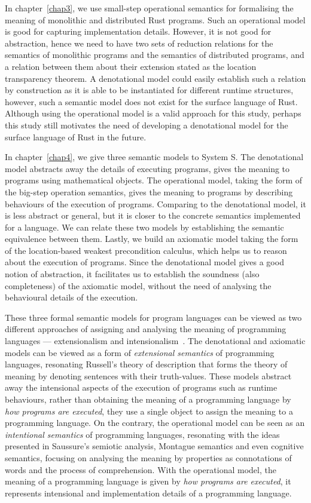 In chapter~\ref{chap3}, we use small-step operational semantics for formalising the meaning of monolithic and distributed Rust programs. Such an operational model is good for capturing implementation details. However, it is not good for abstraction, hence we need to have two sets of reduction relations for the semantics of monolithic programs and the semantics of distributed programs, and a relation between them about their extension stated as the location transparency theorem. A denotational model could easily establish such a relation by construction as it is able to be instantiated for different runtime structures, however, such a semantic model does not exist for the surface language of Rust. Although using the operational model is a valid approach for this study, perhaps this study still motivates the need of developing a denotational model for the surface language of Rust in the future.

In chapter~\ref{chap4}, we give three semantic models to System S. The denotational model abstracts away the details of executing programs, gives the meaning to programs using mathematical objects. The operational model, taking the form of the big-step operation semantics, gives the meaning to programs by describing behaviours of the execution of programs. Comparing to the denotational model, it is less abstract or general, but it is closer to the concrete semantics implemented for a language. We can relate these two models by establishing the semantic equivalence between them. Lastly, we build an axiomatic model taking the form of the location-based weakest precondition calculus, which helps us to reason about the execution of programs.
Since the denotational model gives a good notion of abstraction, it facilitates us to establish the soundness (also completeness) of the axiomatic model, without the need of analysing the behavioural details of the execution.

These three formal semantic models for program languages can be viewed as two different approaches of assigning and analysing the meaning of programming languages --- extensionalism and intensionalism~\citep{van_Eijck_Unger_2010}. The denotational and axiomatic models can be viewed as a form of \emph{extensional semantics} of programming languages, resonating Russell's theory of description that forms the theory of meaning by denoting sentences with their truth-values. These models abstract away the intensional aspects of the execution of programs such as runtime behaviours, rather than obtaining the meaning of a programming language by \emph{how programs are executed}, they use a single object to assign the meaning to a programming language. On the contrary, the operational model can be seen as an \emph{intentional semantics} of programming languages, resonating with the ideas presented in Saussure's semiotic analysis, Montague semantics and even cognitive semantics, focusing on analysing the meaning by properties as connotations of words and the process of comprehension. With the operational model, the meaning of a programming language is given by \emph{how programs are executed}, it represents intensional and implementation details of a programming language.


